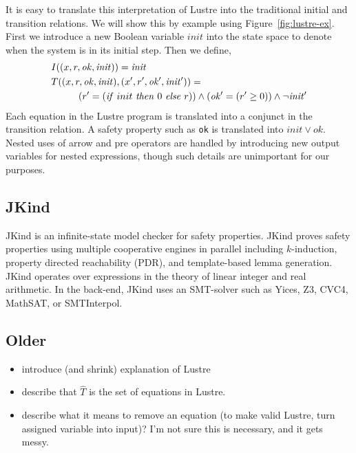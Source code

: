 It is easy to translate this interpretation of Lustre into the
traditional initial and transition relations. We will show this by
example using Figure~\ref{fig:lustre-ex}. First we introduce a new Boolean
variable $init$ into the state space to denote when the system is in
its initial step. Then we define,
\begin{align*}
  &I((x, r, \mathit{ok}, \mathit{init})) = \mathit{init} \\
  &T((x, r, \mathit{ok}, \mathit{init}), (x', r', \mathit{ok'},
  \mathit{init'})) = \\
  &\hspace{1cm} (r' = (\mathit{if}\ init\ \mathit{then}\ 0\ \mathit{else}\ r)) \land (\mathit{ok'} =
  (r' \geq 0)) \land \neg\mathit{init'}
\end{align*}
Each equation in the Lustre program is translated into a conjunct in
the transition relation. A safety property such as {\tt ok} is
translated into $\mathit{init} \lor \mathit{ok}$. Nested uses of arrow
and pre operators are handled by introducing new output variables for
nested expressions, though such details are unimportant for our
purposes.

\subsection{JKind}

JKind is an infinite-state model checker for safety properties. JKind
proves safety properties using multiple cooperative engines in
parallel including $k$-induction, property directed reachability
(PDR), and template-based lemma generation. JKind operates over
expressions in the theory of linear integer and real arithmetic. In
the back-end, JKind uses an SMT-solver such as Yices, Z3, CVC4,
MathSAT, or SMTInterpol.


\subsection{Older}

\begin{itemize}
    \item introduce (and shrink) explanation of Lustre
    \item describe that $\widehat T$ is the set of equations in Lustre.
    \item describe what it means to remove an equation (to make valid Lustre, 
        turn assigned variable into input)?  I'm not sure this is necessary, and it 
        gets messy.
\end{itemize}

